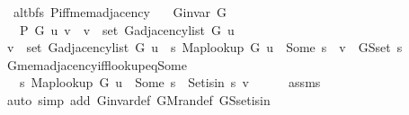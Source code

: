 \begin{isabellebody}
\endisatagproof
{\isafoldproof}%
%
\isadelimproof
\isanewline
%
\endisadelimproof
%
\isadeliminvisible
\isanewline
%
\endisadeliminvisible
%
\isataginvisible
{}\isamarkupfalse%
\ {\isacharparenleft}{\kern0pt}\ alt{\isacharunderscore}{\kern0pt}bfs{\isacharparenright}{\kern0pt}\ P{\isacharunderscore}{\kern0pt}iff{\isacharunderscore}{\kern0pt}mem{\isacharunderscore}{\kern0pt}adjacency{\isacharcolon}{\kern0pt}\isanewline
\ \ \ {\isachardoublequoteopen}G{\isachardot}{\kern0pt}invar\ G{\isachardoublequoteclose}\isanewline
\ \ \ {\isachardoublequoteopen}P\ G\ u\ v\ {\isasymlongleftrightarrow}\ v\ {\isasymin}\ set\ {\isacharparenleft}{\kern0pt}G{\isachardot}{\kern0pt}adjacency{\isacharunderscore}{\kern0pt}list\ G\ u{\isacharparenright}{\kern0pt}{\isachardoublequoteclose}%
\endisataginvisible
{\isafoldinvisible}%
%
\isadeliminvisible
\isanewline
%
\endisadeliminvisible
%
\isadelimproof
%
\endisadelimproof
%
\isatagproof
{}\isamarkupfalse%
\ {\isacharminus}{\kern0pt}\isanewline
\ \ \isamarkupfalse%
\ {\isachardoublequoteopen}v\ {\isasymin}\ set\ {\isacharparenleft}{\kern0pt}G{\isachardot}{\kern0pt}adjacency{\isacharunderscore}{\kern0pt}list\ G\ u{\isacharparenright}{\kern0pt}\ {\isasymlongleftrightarrow}\ {\isacharparenleft}{\kern0pt}{\isasymexists}s{\isachardot}{\kern0pt}\ Map{\isacharunderscore}{\kern0pt}lookup\ G\ u\ {\isacharequal}{\kern0pt}\ Some\ s\ {\isasymand}\ v\ {\isasymin}\ G{\isachardot}{\kern0pt}S{\isachardot}{\kern0pt}set\ s{\isacharparenright}{\kern0pt}{\isachardoublequoteclose}\isanewline
\ \ \ \ \isamarkupfalse%
\ G{\isachardot}{\kern0pt}mem{\isacharunderscore}{\kern0pt}adjacency{\isacharunderscore}{\kern0pt}iff{\isacharunderscore}{\kern0pt}lookup{\isacharunderscore}{\kern0pt}eq{\isacharunderscore}{\kern0pt}Some\isanewline
\ \ \ \ \isacommand{{\isachardot}{\kern0pt}}\isamarkupfalse%
\isanewline
\ \ \isamarkupfalse%
\ \isamarkupfalse%
\ {\isachardoublequoteopen}{\isachardot}{\kern0pt}{\isachardot}{\kern0pt}{\isachardot}{\kern0pt}\ {\isasymlongleftrightarrow}\ {\isacharparenleft}{\kern0pt}{\isasymexists}s{\isachardot}{\kern0pt}\ Map{\isacharunderscore}{\kern0pt}lookup\ G\ u\ {\isacharequal}{\kern0pt}\ Some\ s\ {\isasymand}\ Set{\isacharunderscore}{\kern0pt}isin\ s\ v{\isacharparenright}{\kern0pt}{\isachardoublequoteclose}\isanewline
\ \ \ \ \isamarkupfalse%
\ assms\isanewline
\ \ \ \ \isamarkupfalse%
\ {\isacharparenleft}{\kern0pt}auto\ simp\ add{\isacharcolon}{\kern0pt}\ G{\isachardot}{\kern0pt}invar{\isacharunderscore}{\kern0pt}def\ G{\isachardot}{\kern0pt}M{\isachardot}{\kern0pt}ran{\isacharunderscore}{\kern0pt}def\ G{\isachardot}{\kern0pt}S{\isachardot}{\kern0pt}set{\isacharunderscore}{\kern0pt}isin{\isacharparenright}{\kern0pt}\isanewline

\end{isabellebody}

